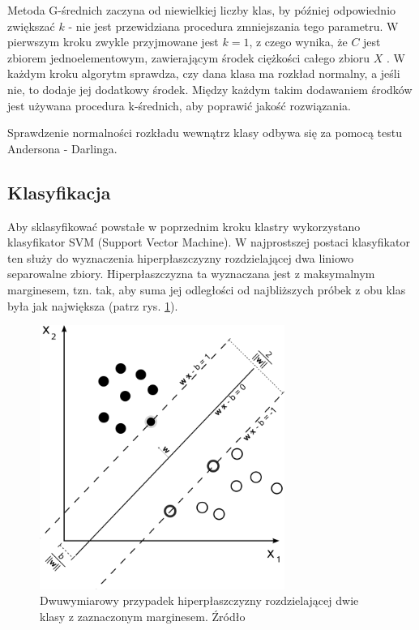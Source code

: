 Metoda G-średnich zaczyna od niewielkiej liczby klas, by później odpowiednio zwiększać $k$ - nie jest przewidziana procedura zmniejszania tego parametru. W pierwszym kroku zwykle przyjmowane jest $k = 1$, z czego wynika, że $C$ jest zbiorem jednoelementowym, zawierającym środek ciężkości całego zbioru $X$ \cite{GMeans}. W każdym kroku algorytm sprawdza, czy dana klasa ma rozkład normalny, a jeśli nie, to dodaje jej dodatkowy środek. Między każdym takim dodawaniem środków jest używana procedura k-średnich, aby poprawić jakość rozwiązania.

Sprawdzenie normalności rozkładu wewnątrz klasy odbywa się za pomocą testu Andersona - Darlinga. 

\subsection{Klasyfikacja}

\qquad Aby sklasyfikować powstałe w poprzednim kroku klastry wykorzystano klasyfikator SVM (Support Vector Machine). W najprostszej postaci klasyfikator ten służy do wyznaczenia hiperpłaszczyzny rozdzielającej dwa liniowo separowalne zbiory. Hiperpłaszczyzna ta wyznaczana jest z maksymalnym marginesem, tzn. tak, aby suma jej odległości od najbliższych próbek z obu klas była jak największa (patrz rys. \ref{fig:SVM}).

\begin{figure}[h]
	\centering
	\includegraphics[width=8cm]{Grafika/Svm_max_sep_hyperplane_with_margin}
	\caption{Dwuwymiarowy przypadek hiperpłaszczyzny rozdzielającej dwie klasy z zaznaczonym marginesem. Źródło \cite{SVMWiki}}
	\label{fig:SVM}
\end{figure}

